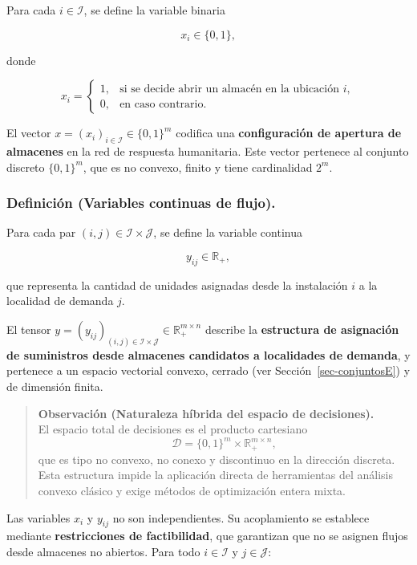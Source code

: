 \documentclass[
  spanish,
  us-letterpaper,
]{scrreprt}
\numberwithin{equation}{section}
\begin{document}
Para cada \(i \in \mathcal{I}\), se define la variable binaria

\[
x_i \in \{0,1\},
\]

donde

\[
x_i =
\begin{cases}
1, & \text{si se decide abrir un almacén en la ubicación } i, \\
0, & \text{en caso contrario}.
\end{cases}
\]

El vector \(x = (x_i)_{i \in \mathcal{I}} \in \{0,1\}^m\) codifica una
\textbf{configuración de apertura de almacenes} en la red de respuesta
humanitaria. Este vector pertenece al conjunto discreto \(\{0,1\}^m\),
que es no convexo, finito y tiene cardinalidad \(2^m\).

\subsubsection{\texorpdfstring{\textbf{Definición (Variables continuas
de
flujo).}}{Definición (Variables continuas de flujo).}}\label{definiciuxf3n-variables-continuas-de-flujo.}

Para cada par \((i,j) \in \mathcal{I} \times \mathcal{J}\), se define la
variable continua

\[
y_{ij} \in \mathbb{R}_+,
\]

que representa la cantidad de unidades asignadas desde la instalación
\(i\) a la localidad de demanda \(j\).

El tensor
\(y = (y_{ij})_{(i,j) \in \mathcal{I} \times \mathcal{J}} \in \mathbb{R}_+^{m \times n}\)
describe la \textbf{estructura de asignación de suministros desde
almacenes candidatos a localidades de demanda}, y pertenece a un espacio
vectorial convexo, cerrado (ver Sección~\ref{sec-conjuntosE}) y de
dimensión finita.

\begin{quote}
\textbf{Observación (Naturaleza híbrida del espacio de decisiones).}\\
El espacio total de decisiones es el producto cartesiano\\
\[
\mathcal{D} = \{0,1\}^m \times \mathbb{R}_+^{m \times n},
\] que es tipo no convexo, no conexo y discontinuo en la dirección
discreta. Esta estructura impide la aplicación directa de herramientas
del análisis convexo clásico y exige métodos de optimización entera
mixta.
\end{quote}

Las variables \(x_i\) y \(y_{ij}\) no son independientes. Su
acoplamiento se establece mediante \textbf{restricciones de
factibilidad}, que garantizan que no se asignen flujos desde almacenes
no abiertos. Para todo \(i \in \mathcal{I}\) y \(j \in \mathcal{J}\):
\end{document}
